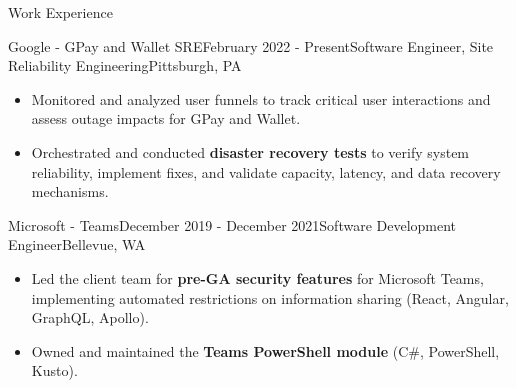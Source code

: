 \documentclass{resume} %
\begin{document}

\begin{rSection}{Work Experience}


\begin{rSubsection}{Google - GPay and Wallet SRE}{February 2022 - Present}{Software Engineer, Site Reliability Engineering}{Pittsburgh, PA}
\begin{itemize}
 \item Monitored and analyzed user funnels to track critical user interactions and assess outage impacts for GPay and Wallet.
 \item Orchestrated and conducted \textbf{disaster recovery tests} to verify system reliability, implement fixes, and validate capacity, latency, and data recovery mechanisms.
\end{itemize}
\end{rSubsection}


\begin{rSubsection}{Microsoft - Teams}{December 2019 - December 2021}{Software Development Engineer}{Bellevue, WA}
\begin{itemize}
 \item Led the client team for \textbf{pre-GA security features} for Microsoft Teams, implementing automated restrictions on information sharing (React, Angular, GraphQL, Apollo).
 \item Owned and maintained the \textbf{Teams PowerShell module} (C\#, PowerShell, Kusto).
\end{itemize}
\end{rSubsection}



\end{rSection}
\end{document}
